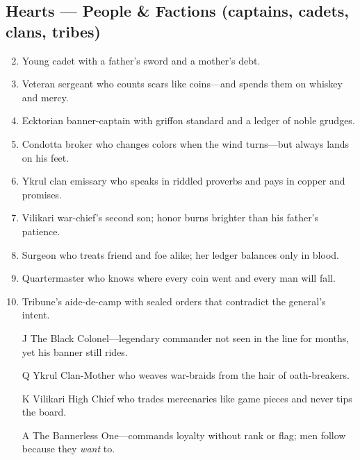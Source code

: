 \subsection*{Hearts --- People \& Factions (captains, cadets, clans, tribes)}
\label{sec:black-banners-people}
\begin{enumerate}
\setcounter{enumi}{1}
\item Young cadet with a father’s sword and a mother’s debt.
\item Veteran sergeant who counts scars like coins—and spends them on whiskey and mercy.
\item Ecktorian banner-captain with griffon standard and a ledger of noble grudges.
\item Condotta broker who changes colors when the wind turns—but always lands on his feet.
\item Ykrul clan emissary who speaks in riddled proverbs and pays in copper and promises.
\item Vilikari war-chief’s second son; honor burns brighter than his father’s patience.
\item Surgeon who treats friend and foe alike; her ledger balances only in blood.
\item Quartermaster who knows where every coin went and every man will fall.
\item Tribune’s aide-de-camp with sealed orders that contradict the general’s intent.
\item[J] The Black Colonel—legendary commander not seen in the line for months, yet his banner still rides.
\item[Q] Ykrul Clan-Mother who weaves war-braids from the hair of oath-breakers.
\item[K] Vilikari High Chief who trades mercenaries like game pieces and never tips the board.
\item[A] The Bannerless One—commands loyalty without rank or flag; men follow because they \emph{want} to.
\end{enumerate}

